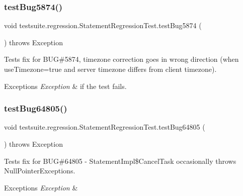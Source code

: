 \subsubsection{\texorpdfstring{test\+Bug5874()}{testBug5874()}}
{\footnotesize\ttfamily void testsuite.\+regression.\+Statement\+Regression\+Test.\+test\+Bug5874 (\begin{DoxyParamCaption}{ }\end{DoxyParamCaption}) throws Exception}

Tests fix for B\+UG\#5874, timezone correction goes in wrong \textquotesingle{}direction\textquotesingle{} (when use\+Timezone=true and server timezone differs from client timezone).


\begin{DoxyExceptions}{Exceptions}
{\em Exception} & if the test fails. \\
\hline
\end{DoxyExceptions}
\mbox{\label{classtestsuite_1_1regression_1_1_statement_regression_test_af54f8dc05c901b420749b5525d6b1db9}} 
\subsubsection{\texorpdfstring{test\+Bug64805()}{testBug64805()}}
{\footnotesize\ttfamily void testsuite.\+regression.\+Statement\+Regression\+Test.\+test\+Bug64805 (\begin{DoxyParamCaption}{ }\end{DoxyParamCaption}) throws Exception}

Tests fix for B\+UG\#64805 -\/ Statement\+Impl\$\+Cancel\+Task occasionally throws Null\+Pointer\+Exceptions.


\begin{DoxyExceptions}{Exceptions}
{\em Exception} & \\
\hline
\end{DoxyExceptions}
\mbox{\label{classtestsuite_1_1regression_1_1_statement_regression_test_ae6be3545c08d7afbbad86397d2ef9fb0}} 
